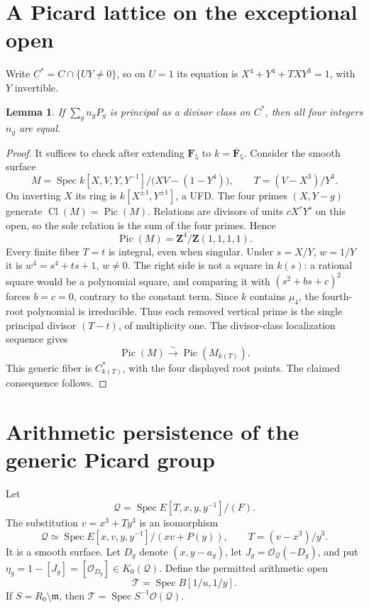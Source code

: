 \documentclass[11pt,a4paper]{article}
\newtheorem{lemma}[theorem]{Lemma}
\theoremstyle{remark}
\newcommand{\Z}{\mathbf Z}
\newcommand{\F}{\mathbf F}
\newcommand{\OO}{\mathcal O}
\newcommand{\Spec}{\operatorname{Spec}}
\newcommand{\Pic}{\operatorname{Pic}}
\newcommand{\Cl}{\operatorname{Cl}}
\begin{document}
\section{A Picard lattice on the exceptional open}

Write $C^*=C\cap\{UY\ne0\}$, so on $U=1$ its equation is
$X^4+Y^4+TXY^3=1$, with $Y$ invertible.

\begin{lemma}\label{lem:twodimexceptionalpic}
If $\sum_g n_gP_g$ is principal as a divisor class on $C^*$, then
all four integers $n_g$ are equal.
\end{lemma}
\begin{proof}
It suffices to check after extending $\F_5$ to
$k=\overline{\F}_5$. Consider the smooth surface
\[
 M=\Spec k[X,V,Y,Y^{-1}]/\bigl(XV-(1-Y^4)\bigr),
 \qquad T=(V-X^3)/Y^3.
\]
On inverting $X$ its ring is $k[X^{\pm1},Y^{\pm1}]$, a UFD.
The four primes $(X,Y-g)$ generate $\Cl(M)=\Pic(M)$. Relations
are divisors of units $cX^rY^s$ on this open, so the sole relation
is the sum of the four primes. Hence
\[
 \Pic(M)=\Z^4/\Z(1,1,1,1).
\]
Every finite fiber $T=t$ is integral, even when singular. Under
$s=X/Y$, $w=1/Y$ it is $w^4=s^4+ts+1$, $w\ne0$.
The right side is not a square in $k(s)$: a rational square would be
a polynomial square, and comparing it with $(s^2+bs+c)^2$ forces
$b=c=0$, contrary to the constant term. Since $k$ contains $\mu_4$,
the fourth-root polynomial is irreducible. Thus each removed vertical
prime is the single principal divisor $(T-t)$, of multiplicity one.
The divisor-class localization sequence gives
\[
 \Pic(M)\xrightarrow{\sim}\Pic(M_{k(T)}).
\]
This generic fiber is $C^*_{k(T)}$, with the four displayed root
points. The claimed consequence follows.
\end{proof}

\section{Arithmetic persistence of the generic Picard group}

Let
\[
 \mathcal Q=\Spec E[T,x,y,y^{-1}]/(F).
\]
The substitution $v=x^3+Ty^3$ is an isomorphism
\begin{equation}\label{eq:twodimdanielewski}
 \mathcal Q\simeq\Spec E[x,v,y,y^{-1}]/(xv+P(y)),
 \qquad T=(v-x^3)/y^3.
\end{equation}
It is a smooth surface. Let $D_g$ denote $(x,y-a_g)$, let
$J_g=\OO_{\mathcal Q}(-D_g)$, and put
$\eta_g=1-[J_g]=[\OO_{D_g}]\in K_0(\mathcal Q)$.
Define the permitted arithmetic open
\[
 \mathcal T=\Spec B[1/u,1/y].
\]
If $S=R_0\setminus\mathfrak m$, then
$\mathcal T=\Spec S^{-1}\OO(\mathcal Q)$.
\end{document}
